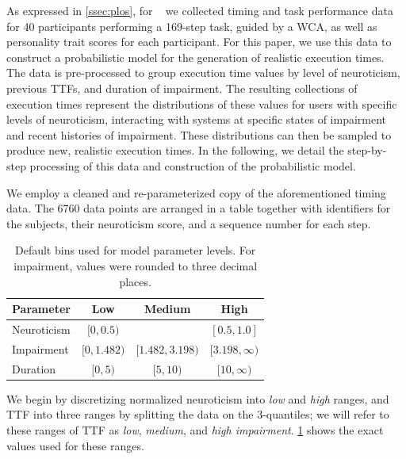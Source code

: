 
As expressed in \cref{ssec:plos}, for ~\cite{olguinmunoz:impact2021} we collected timing and task performance data for \num{40} participants performing a \num{169}-step task, guided by a \gls{WCA}, as well as personality trait scores for each participant.
For this paper, we use this data to construct a probabilistic model for the generation of realistic execution times.
The data is pre-processed to group execution time values by level of neuroticism, previous \glspl{TTF}, and duration of impairment.
The resulting collections of execution times represent the distributions of these values for users with specific levels of neuroticism, interacting with systems at specific states of impairment and recent histories of impairment.
These distributions can then be sampled to produce new, realistic execution times.
In the following, we detail the step-by-step processing of this data and construction of the probabilistic model.

We employ a cleaned and re-parameterized copy of the aforementioned timing data.
The \num{6760} data points are arranged in a table together with identifiers for the subjects, their neuroticism score, and a sequence number for each step.

\begin{table}[]
    \centering
    \caption{%
        Default bins used for model parameter levels.
        For impairment, values were rounded to three decimal places.
    }
    \label{tab:defaultbins}
    \begin{tabular}{@{}lccc@{}}
        \toprule
        \textbf{Parameter} & \textbf{Low}     & \textbf{Medium}      & \textbf{High}         \\ \midrule
        Neuroticism        & \( [0, 0.5) \)   &                      & \( [0.5, 1.0] \)      \\
        Impairment         & \( [0, 1.482) \) & \( [1.482, 3.198) \) & \( [3.198, \infty) \) \\
        Duration           & \( [0, 5) \)     & \( [5, 10) \)        & \( [10, \infty) \)    \\ \bottomrule
    \end{tabular}%
\end{table}

We begin by discretizing normalized neuroticism into \emph{low} and \emph{high} ranges, and \gls{TTF} into three ranges by splitting the data on the 3-quantiles; we will refer to these ranges of \gls{TTF} as \emph{low}, \emph{medium}, and \emph{high impairment}.
\cref{tab:defaultbins} shows the exact values used for these ranges.

